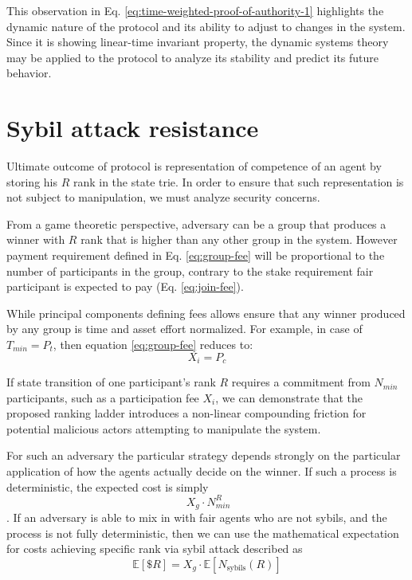 \documentclass{article}
\begin{document}
\begin{CJK}{UTF8}{gbsn}
    This observation in Eq. \ref{eq:time-weighted-proof-of-authority-1} highlights the dynamic nature of the protocol and its ability to adjust to changes in the system. Since it is showing linear-time invariant property, the dynamic systems theory may be applied to the protocol to analyze its stability and predict its future behavior.



    \section{Sybil attack resistance}
    Ultimate outcome of protocol is representation of competence of an agent by storing his $R$ rank in the state trie. In order to ensure that such representation is not subject to manipulation, we must analyze security concerns.

    From a game theoretic perspective, adversary can be a group that produces a winner with $R$ rank that is higher than any other group in the system. However payment requirement defined in Eq. \ref{eq:group-fee} will be proportional to the number of participants in the group, contrary to the stake requirement fair participant is expected to pay (Eq. \ref{eq:join-fee}).

    While principal components defining fees allows ensure that any winner produced by any group is time and asset effort normalized.
    For example, in case of $T_{min} = P_t$, then equation \ref{eq:group-fee} reduces to:
    \begin{equation}
        \label{eq:join-fee-2}
        X_i = P_c
    \end{equation}

    If state transition of one participant's rank $R$ requires a commitment from $N_{min}$ participants, such as a participation fee $X_i$, we can demonstrate that the proposed ranking ladder introduces a non-linear compounding friction for potential malicious actors attempting to manipulate the system.

    For such an adversary the particular strategy depends strongly on the particular application of how the agents actually decide on the winner. If such a process is deterministic, the expected cost is simply
    \begin{equation}\
        \label{eq:direct-sybil-cost}
        X_g \cdot N_{min}^R
    \end{equation}. If an adversary is able to mix in with fair agents who are not sybils, and the process is not fully deterministic, then we can use the mathematical expectation for costs achieving specific rank via sybil attack described as
    \begin{equation}
        \mathbb{E}[\$R] = X_g \cdot \mathbb{E}[N_{\text{sybils}}(R)]
    \end{equation}


\end{CJK}
\end{document}

